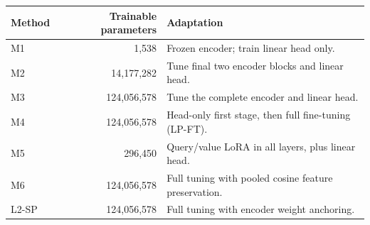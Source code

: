 \begin{tabular}{lrp{105mm}}\toprule
Method & Trainable parameters & Adaptation\\\midrule
M1 & 1,538 & Frozen encoder; train linear head only.\\
M2 & 14,177,282 & Tune final two encoder blocks and linear head.\\
M3 & 124,056,578 & Tune the complete encoder and linear head.\\
M4 & 124,056,578 & Head-only first stage, then full fine-tuning (LP-FT).\\
M5 & 296,450 & Query/value LoRA in all layers, plus linear head.\\
M6 & 124,056,578 & Full tuning with pooled cosine feature preservation.\\
L2-SP & 124,056,578 & Full tuning with encoder weight anchoring.\\
\bottomrule\end{tabular}

